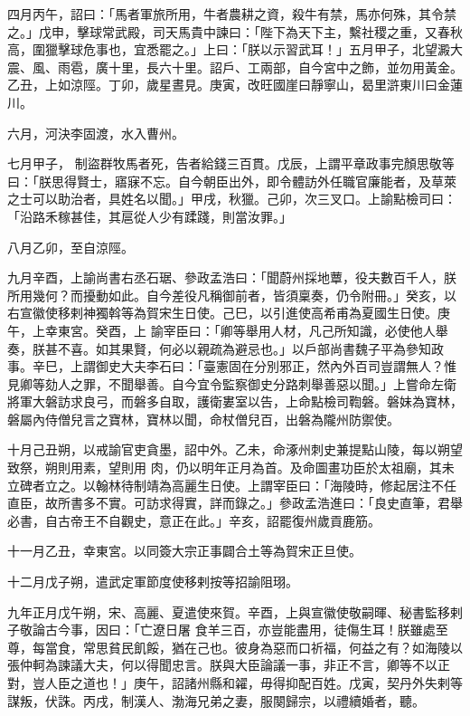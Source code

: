\begin{pinyinscope}
 四月丙午，詔曰：「馬者軍旅所用，牛者農耕之資，殺牛有禁，馬亦何殊，其令禁之。」戊申，擊球常武殿，司天馬貴中諫曰：「陛下為天下主，繫社稷之重，又春秋高，圍獵擊球危事也，宜悉罷之。」上曰：「朕以示習武耳！」五月甲子，北望澱大震、風、雨雹，廣十里，長六十里。詔戶、工兩部，自今宮中之飾，並勿用黃金。乙丑，上如涼陘。丁卯，歲星晝見。庚寅，改旺國崖曰靜寧山，曷里滸東川曰金蓮川。



 六月，河決李固渡，水入曹州。



 七月甲子，
 制盜群牧馬者死，告者給錢三百貫。戊辰，上謂平章政事完顏思敬等曰：「朕思得賢士，寤寐不忘。自今朝臣出外，即令體訪外任職官廉能者，及草萊之士可以助治者，具姓名以聞。」甲戌，秋獵。己卯，次三叉口。上諭點檢司曰：「沿路禾稼甚佳，其扈從人少有蹂踐，則當汝罪。」



 八月乙卯，至自涼陘。



 九月辛酉，上諭尚書右丞石琚、參政孟浩曰：「聞蔚州採地蕈，役夫數百千人，朕所用幾何？而擾動如此。自今差役凡稱御前者，皆須稟奏，仍令附冊。」癸亥，以右宣徽使移剌神獨斡等為賀宋生日使。己巳，以引進使高希甫為夏國生日使。庚午，上幸東宮。癸酉，上
 諭宰臣曰：「卿等舉用人材，凡己所知識，必使他人舉奏，朕甚不喜。如其果賢，何必以親疏為避忌也。」以戶部尚書魏子平為參知政事。辛巳，上謂御史大夫李石曰：「臺憲固在分別邪正，然內外百司豈謂無人？惟見卿等劾人之罪，不聞舉善。自今宜令監察御史分路刺舉善惡以聞。」上嘗命左衛將軍大磐訪求良弓，而磐多自取，護衛婁室以告，上命點檢司鞫磐。磐妹為寶林，磐屬內侍僧兒言之寶林，寶林以聞，命杖僧兒百，出磐為隴州防禦使。



 十月己丑朔，以戒諭官吏貪墨，詔中外。乙未，命涿州刺史兼提點山陵，每以朔望致祭，朔則用素，望則用
 肉，仍以明年正月為首。及命圖畫功臣於太祖廟，其未立碑者立之。以翰林待制靖為高麗生日使。上謂宰臣曰：「海陵時，修起居注不任直臣，故所書多不實。可訪求得實，詳而錄之。」參政孟浩進曰：「良史直筆，君舉必書，自古帝王不自觀史，意正在此。」辛亥，詔罷復州歲貢鹿筋。



 十一月乙丑，幸東宮。以同簽大宗正事闢合土等為賀宋正旦使。



 十二月戊子朔，遣武定軍節度使移剌按等招諭阻珝。



 九年正月戊午朔，宋、高麗、夏遣使來賀。辛酉，上與宣徽使敬嗣暉、秘書監移剌子敬論古今事，因曰：「亡遼日屠
 食羊三百，亦豈能盡用，徒傷生耳！朕雖處至尊，每當食，常思貧民飢餒，猶在己也。彼身為惡而口祈福，何益之有？如海陵以張仲軻為諫議大夫，何以得聞忠言。朕與大臣論議一事，非正不言，卿等不以正對，豈人臣之道也！」庚午，詔諸州縣和糴，毋得抑配百姓。戊寅，契丹外失剌等謀叛，伏誅。丙戌，制漢人、渤海兄弟之妻，服闋歸宗，以禮續婚者，聽。




\end{pinyinscope}
